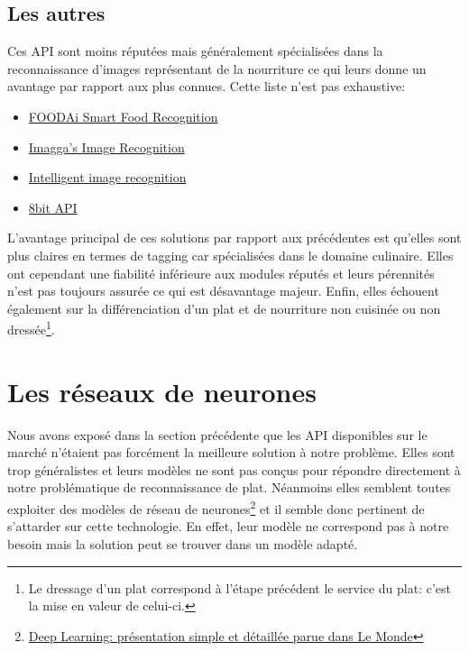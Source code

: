 \documentclass[a4paper,12pt]{report}
\begin{document}
      \subsection{Les autres}
      Ces API sont moins réputées mais généralement spécialisées dans la reconnaissance d'images représentant de la nourriture ce qui leurs donne un avantage par rapport aux plus connues. Cette liste n'est pas exhaustive:

      \bigbreak
      \begin{itemize}
        \item \href{http://foodai.org/}{FOODAi Smart Food Recognition}
        \item \href{https://imagga.com/}{Imagga's Image Recognition}
        \item \href{http://restb.ai/}{Intelligent image recognition}
        \item \href{http://8bit.ai/}{8bit API}
      \end{itemize}
      \bigbreak

      L'avantage principal de ces solutions par rapport aux précédentes est qu'elles sont plus claires en termes de tagging car spécialisées dans le domaine culinaire.
      \medbreak
      Elles ont cependant une fiabilité inférieure aux modules réputés et leurs pérennités n'est pas toujours assurée ce qui est désavantage majeur.
      \medbreak
      Enfin, elles échouent également sur la différenciation d'un plat et de nourriture non cuisinée ou non dressée\footnote{Le dressage d'un plat correspond à l'étape précédent le service du plat: c'est la mise en valeur de celui-ci.}.

    \section{Les réseaux de neurones}
    Nous avons exposé dans la section précédente que les API disponibles sur le marché n'étaient pas forcément la meilleure solution à notre problème. Elles sont trop généralistes et leurs modèles ne sont pas conçus pour répondre directement à notre problématique de reconnaissance de plat. 
    \medbreak
    Néanmoins elles semblent toutes exploiter des modèles de réseau de neurones\footnote{\href{<https://www.lemonde.fr/pixels/article/2015/07/24/comment-le-deep-learning-revolutionne-l-intelligence-artificielle_4695929_4408996.html>}{ Deep Learning: présentation simple et détaillée parue dans Le Monde}} et il semble donc pertinent de s'attarder sur cette technologie. En effet, leur modèle ne correspond pas à notre besoin mais la solution peut se trouver dans un modèle adapté.
    \bigbreak
\end{document}
